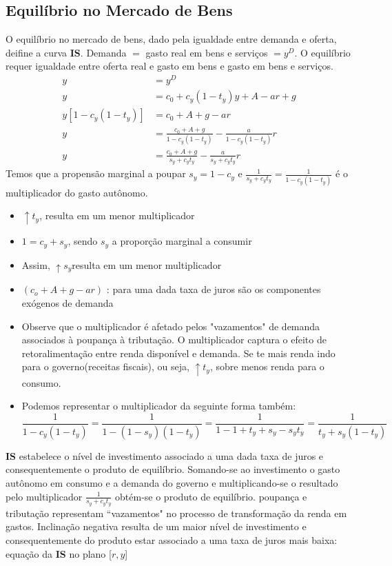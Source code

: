 \documentclass[a4paper,12pt]{article}[abntex2]
\begin{document}
\subsection{\textbf{Equilíbrio no Mercado de Bens}}
O equilíbrio no mercado de bens, dado pela igualdade entre demanda e oferta, deifine a curva \textbf{IS}. Demanda $=$ gasto real  em bens e serviços $=y^D$. O equilíbrio requer igualdade entre oferta real e gasto  em bens e gasto  em bens e serviços.
\begin{align*}
    y &= y^D \\
    y &= c_0 + c_y (1 - t_y)y + A - ar + g \\
    y[1 - c_y(1 - t_y)] &= c_0 + A + g - ar \\
    y &= \frac{c_0 + A + g}{1 - c_y(1 - t_y)} - \frac{a}{1 - c_y(1 - t_y)}r \\
    y &= \frac{c_0 + A + g}{s_y + c_y t_y} - \frac{a}{s_y + c_y t_y}r
\end{align*}
Temos que a propensão marginal a poupar $s_y=1-c_y$ e $\frac{1}{s_y+c_yt_y}=\frac{1}{1-c_y(1-t_y)}$ é o multiplicador do gasto autônomo. \begin{itemize}
    \item $\uparrow t_y$, resulta em um menor multiplicador
    \item $1=c_y+s_y$, sendo $s_y$ a proporção marginal a consumir
    \item Assim, $\uparrow s_y$resulta em um menor multiplicador
    \item $(c_o+A+g-ar)$ : para uma dada taxa de juros são os componentes exógenos de demanda
    \item Observe que o multiplicador é afetado pelos "vazamentos" de demanda associados à poupança à tributação. O multiplicador captura o efeito de retoralimentação entre renda disponível e demanda. Se te mais renda indo para o governo(receitas fiscais), ou seja, \(\uparrow t_y\), sobre menos renda para o consumo. 
    \item Podemos representar o multiplicador da seguinte forma também: 
    \[
    \frac{1}{1-c_y(1-t_y)}=\frac{1}{1-(1-s_y)(1-t_y)}=\frac{1}{1-1+t_y+s_y-s_yt_y}=\frac{1}{t_y+s_y(1-t_y)}
    \]
\end{itemize}

\textbf{IS} estabelece o nível de investimento associado a uma dada taxa de juros e consequentemente o produto de equilíbrio. Somando-se ao investimento o gasto autônomo em consumo e a demanda do governo e multiplicando-se o resultado pelo multiplicador $\frac{1}{s_y+c_yt_y}$ obtém-se o produto de equilíbrio. poupança e tributação representam “vazamentos" no processo de transformação da renda em gastos. Inclinação negativa resulta de um maior nível de investimento e consequentemente do produto estar associado a uma taxa de juros mais baixa: equação da \textbf{IS} no plano [$r,y$]
\end{document}
